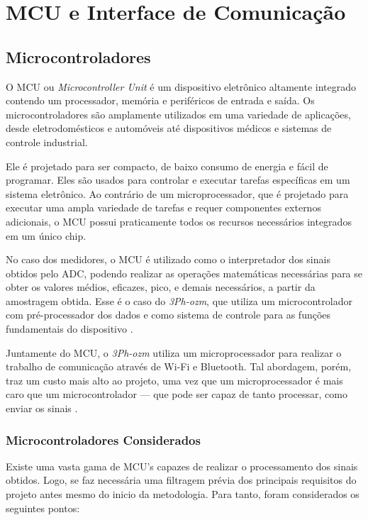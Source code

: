 \section{MCU e Interface de Comunicação}\label{sec:MCUInterface}

\subsection{Microcontroladores}\label{subsec:MCU}

O \gls{MCU} ou \textit{Microcontroller Unit} é um dispositivo eletrônico altamente integrado contendo um processador, memória e periféricos de entrada e saída. Os microcontroladores são amplamente utilizados em uma variedade de aplicações, desde eletrodomésticos e automóveis até dispositivos médicos e sistemas de controle industrial.

Ele é projetado para ser compacto, de baixo consumo de energia e fácil de programar. Eles são usados para controlar e executar tarefas específicas em um sistema eletrônico. Ao contrário de um microprocessador, que é projetado para executar uma ampla variedade de tarefas e requer componentes externos adicionais, o \gls{MCU} possui praticamente todos os recursos necessários integrados em um único chip.

No caso dos medidores, o \gls{MCU} é utilizado como o interpretador dos sinais obtidos pelo \gls{ADC}, podendo realizar as operações matemáticas necessárias para se obter os valores médios, eficazes, pico, e demais necessários, a partir da amostragem obtida. Esse é o caso do \textit{3Ph-ozm}, que utiliza um microcontrolador com pré-processador dos dados e como sistema de controle para as funções fundamentais do dispositivo \cite{3ph-ozm}.

Juntamente do \gls{MCU}, o \textit{3Ph-ozm} utiliza um microprocessador para realizar o trabalho de comunicação através de Wi-Fi e Bluetooth.
Tal abordagem, porém, traz um custo mais alto ao projeto, uma vez que um microprocessador é mais caro que um microcontrolador --- que pode ser capaz de tanto processar, como enviar os sinais \cite{uCdiff}.

\subsubsection{Microcontroladores Considerados} \label{subsubsec:uc-disp}

Existe uma vasta gama de \gls{MCU}'s capazes de realizar o processamento dos sinais obtidos. Logo, se faz necessária uma filtragem prévia dos principais requisitos do projeto antes mesmo do inicio da metodologia.
Para tanto, foram considerados os seguintes pontos:

